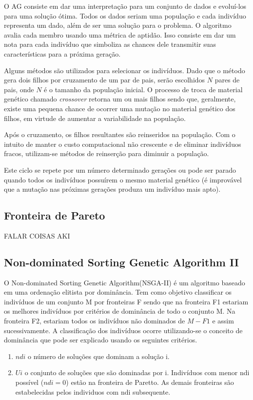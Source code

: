 \documentclass[]{article}
\begin{document}
	O AG consiste em dar uma interpretação para um conjunto de dados e evoluí-los para uma solução ótima. Todos os dados seriam uma população e cada indivíduo representa um dado, além de ser uma solução para o problema. O algoritmo avalia cada membro usando uma métrica de aptidão. Isso consiste em dar um nota para cada indivíduo que simboliza as chances dele transmitir suas características para a próxima geração.
	
	Alguns métodos são utilizados para selecionar os indivíduos. Dado que o método gera dois filhos por cruzamento de um par de pais, serão escolhidos $N$ pares de pais, onde $N$ é o tamanho da população inicial. O processo de troca de material genético chamado \textit{crossover} retorna um ou mais filhos sendo que, geralmente, existe uma pequena chance de ocorrer uma mutação no material genético dos filhos, em virtude de aumentar a variabilidade na população.
	
	Após o cruzamento, os filhos resultantes são reinseridos na população. Com o intuito de manter o custo computacional não crescente e de eliminar indivíduos fracos, utilizam-se métodos de reinserção para diminuir a população.
	
	Este ciclo se repete por um número determinado gerações ou pode ser parado quando todos os indivíduos possuírem o mesmo material genético (é improvável que a mutação nas próximas gerações produza um indivíduo mais apto). 

\subsection{Fronteira de Pareto}
	FALAR COISAS AKI
	
	
\subsection{Non-dominated Sorting Genetic Algorithm II}
	O  Non-dominated Sorting Genetic Algorithm(NSGA-II)\cite{NSGAII} é um algoritmo baseado em uma ordenação elitista por dominância. Tem como objetivo classificar os indivíduos de um conjunto M por fronteiras F sendo que na fronteira F1 estariam os melhores indivíduos por critérios de dominância de todo o conjunto M. Na fronteira F2, estariam todos os indivíduos não dominados de $M-F1$ e assim sucessivamente.
    A classificação dos indivíduos ocorre utilizando-se o conceito de dominância que pode ser explicado usando os seguintes critérios.
    \begin{enumerate}
    \item $ndi$ o número de soluções que dominam a solução i.
    \item $Ui$ o conjunto de soluções que são dominadas por i.
 	Indivíduos com menor ndi possível ($ndi = 0$)  estão na fronteira de Paretto. As demais fronteiras são estabelecidas pelos individuos com ndi subsequente. 
    \end{enumerate}
    
\end{document}
